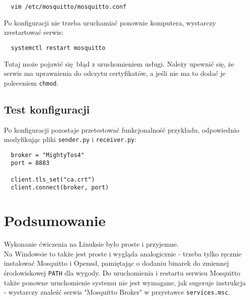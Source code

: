 \documentclass[10pt,a4paper]{article}
\begin{document}
\begin{verbatim}
  vim /etc/mosquitto/mosquitto.conf
\end{verbatim}

Po konfiguracji nie trzeba uruchamiać ponownie komputera, wystarczy zrestartować serwis:

\begin{verbatim}
  systemctl restart mosquitto
\end{verbatim}

Tutaj może pojawić się błąd z uruchomieniem usługi. Należy upewnić się, że serwis ma uprawnienia do odczytu certyfikatów, a jeśli nie ma to dodać je poleceniem \texttt{chmod}.

\subsection{Test konfiguracji}
Po konfiguracji pozostaje przetestować funkcjonalność przykładu, odpowiednio modyfikując pliki \texttt{sender.py} i \texttt{receiver.py}:

\begin{verbatim}
  broker = "MightyTos4"
  port = 8883

  client.tls_set("ca.crt")
  client.connect(broker, port)
\end{verbatim}

\section{Podsumowanie}
Wykonanie ćwiczenia na Linuksie było proste i przyjemne.\\
Na Windowsie to także jest proste i wygląda analogicznie - trzeba tylko ręcznie instalować Mosquitto i Openssl, pamiętając o dodaniu binarek do zmiennej środowiskowej \texttt{PATH} dla wygody. Do uruchomienia i restartu serwisu Mosquitto także ponowne uruchomienie systemu nie jest wymagane, jak sugeruje instrukcja - wystarczy znaleźć serwis "Mosquitto Broker" w przystawce \texttt{services.msc}.
\end{document}

